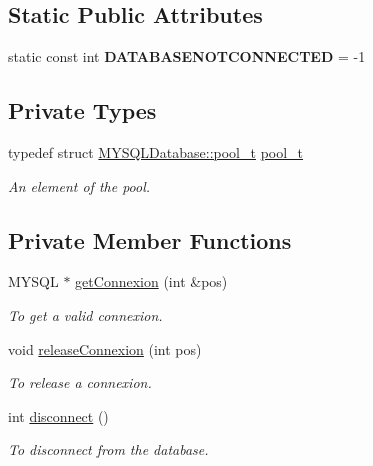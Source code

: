 \subsection*{Static Public Attributes}
\begin{DoxyCompactItemize}
\item 
\hypertarget{classMYSQLDatabase_a12ea7f827acaedc95bdd9d807ff37b0d}{
static const int {\bfseries DATABASENOTCONNECTED} = -\/1}
\label{classMYSQLDatabase_a12ea7f827acaedc95bdd9d807ff37b0d}

\end{DoxyCompactItemize}
\subsection*{Private Types}
\begin{DoxyCompactItemize}
\item 
\hypertarget{classMYSQLDatabase_a50a4db462aa1443e1bf95f302c5d1667}{
typedef struct \hyperlink{structMYSQLDatabase_1_1pool__t}{MYSQLDatabase::pool\_\-t} \hyperlink{classMYSQLDatabase_a50a4db462aa1443e1bf95f302c5d1667}{pool\_\-t}}
\label{classMYSQLDatabase_a50a4db462aa1443e1bf95f302c5d1667}

\begin{DoxyCompactList}\small\item\em An element of the pool. \item\end{DoxyCompactList}\end{DoxyCompactItemize}
\subsection*{Private Member Functions}
\begin{DoxyCompactItemize}
\item 
MYSQL $\ast$ \hyperlink{classMYSQLDatabase_a5ada78b55aa03323946486df4644d0a0}{getConnexion} (int \&pos)
\begin{DoxyCompactList}\small\item\em To get a valid connexion. \item\end{DoxyCompactList}\item 
void \hyperlink{classMYSQLDatabase_a2f54fedb92297729fb59becefe214928}{releaseConnexion} (int pos)
\begin{DoxyCompactList}\small\item\em To release a connexion. \item\end{DoxyCompactList}\item 
int \hyperlink{classMYSQLDatabase_a4dc57bd6bec47b4e0c19163c1d6c7fbe}{disconnect} ()
\begin{DoxyCompactList}\small\item\em To disconnect from the database. \item\end{DoxyCompactList}\end{DoxyCompactItemize}
